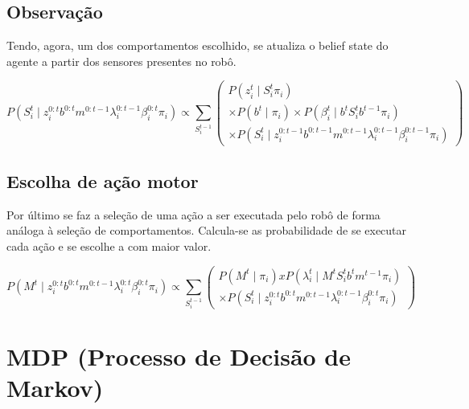 \subsection{Observação}

Tendo, agora, um dos comportamentos escolhido, se atualiza o belief state do agente a partir dos sensores presentes no robô.

\begin{equation}
    P \left( S_i^t \mid z_i^{0: t} b^{0: t} m^{0: t-1} \lambda_i^{0: t-1} \beta_i^{0: t} \pi_i \right) \propto \sum\limits_{S_i^{t-1}}
        \left(
            \begin{array}{l}
                P \left( z_i^t \mid S_i^t \pi_i \right) \\
                \times P \left( b^t \mid \pi_i \right) \times   P \left( \beta_i^t \mid b^t S_i^t b^{t-1} \pi_i \right) \\
                \times P \left( S_i^t \mid z_i^{0: t-1} b^{0: t-1} m^{0: t-1} \lambda_i^{0: t-1} \beta_i^{0: t-1} \pi_i \right)
            \end{array}
        \right)
\end{equation}


\subsection{Escolha de ação motor}

Por último se faz a seleção de uma ação a ser executada pelo robô de forma análoga à seleção de comportamentos. Calcula-se as probabilidade de se executar cada ação  e se escolhe a com maior valor.

\begin{equation}
    P \left( M^t \mid z_i^{0: t} b^{0: t} m^{0: t-1} \lambda_i^{0: t} \beta_i^{0: t} \pi_i \right) \propto \sum\limits_{S_i^{t-1}}
        \left(
            \begin{array}{l}
                P \left( M^t \mid \pi_i \right) x   P \left( \lambda_i^t \mid M^t S_i^t b^t m^{t-1} \pi_i \right)\\
                \times P \left( S_i^t \mid z_i^{0: t} b^{0: t} m^{0: t-1} \lambda_i^{0: t-1} \beta_i^{0: t} \pi_i \right)
            \end{array}
        \right)
\end{equation}


\section{MDP (Processo de Decisão de Markov)} \label{section:SecaoMDP}

